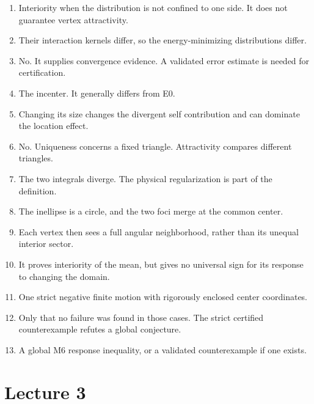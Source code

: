 \documentclass[11pt,oneside,openany]{book}
\begin{document}
\begin{enumerate}

\item Interiority when the distribution is not confined to one side. It does not guarantee vertex attractivity.

\item Their interaction kernels differ, so the energy-minimizing distributions differ.

\item No. It supplies convergence evidence. A validated error estimate is needed for certification.

\item The incenter. It generally differs from E0.

\item Changing its size changes the divergent self contribution and can dominate the location effect.

\item No. Uniqueness concerns a fixed triangle. Attractivity compares different triangles.

\item The two integrals diverge. The physical regularization is part of the definition.

\item The inellipse is a circle, and the two foci merge at the common center.

\item Each vertex then sees a full angular neighborhood, rather than its unequal interior sector.

\item It proves interiority of the mean, but gives no universal sign for its response to changing the domain.

\item One strict negative finite motion with rigorously enclosed center coordinates.

\item Only that no failure was found in those cases. The strict certified counterexample refutes a global conjecture.

\item A global M6 response inequality, or a validated counterexample if one exists.

\end{enumerate}

\section{Lecture 3}
\end{document}
